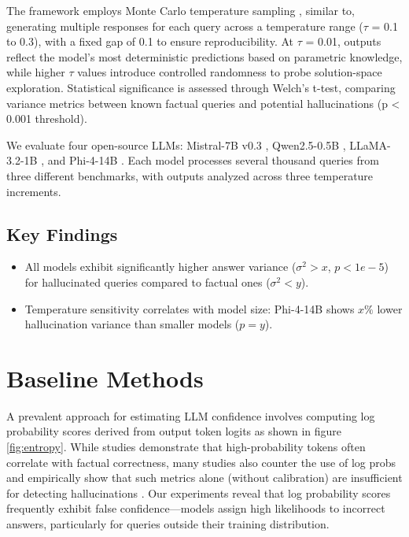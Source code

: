 \documentclass[sigconf]{acmart}
\begin{document}
The framework employs Monte Carlo temperature sampling \cite{monte_carlo_temperature}, similar to, generating multiple responses for each query across a temperature range ($\tau$ = 0.1 to 0.3), with a fixed gap of 0.1 to ensure reproducibility. At $\tau$ = 0.01, outputs reflect the model's most deterministic predictions based on parametric knowledge, while higher $\tau$ values introduce controlled randomness to probe solution-space exploration. Statistical significance is assessed through Welch's t-test, comparing variance metrics between known factual queries and potential hallucinations (p < 0.001 threshold).

We evaluate four open-source LLMs: Mistral-7B v0.3 \cite{mistral_7b}, Qwen2.5-0.5B \cite{Qwen2.5}, LLaMA-3.2-1B \cite{llama_3.2}, and Phi-4-14B \cite{phi_4}. Each model processes several thousand queries from three different benchmarks, with outputs analyzed across three temperature increments.

\subsection{Key Findings}
\begin{itemize}
    \item All models exhibit significantly higher answer variance ($\sigma^2 > x$, $p < 1e-5$) for hallucinated queries compared to factual ones ($\sigma^2 < y$).
    \item Temperature sensitivity correlates with model size: Phi-4-14B shows $x\%$ lower hallucination variance than smaller models ($p = y$).
\end{itemize}


\section{Baseline Methods}

A prevalent approach for estimating LLM confidence involves computing log probability scores derived from output token logits \cite{emnlp_2015} as shown in figure \ref{fig:entropy}. While studies \cite{strength_in_numbers} demonstrate that high-probability tokens often correlate with factual correctness, many studies also counter the use of log probs and empirically show that such metrics alone (without calibration) are insufficient for detecting hallucinations \cite{cycles_thought,calibrated_hallucinate}. Our experiments reveal that log probability scores frequently exhibit false confidence—models assign high likelihoods to incorrect answers, particularly for queries outside their training distribution.
\end{document}
